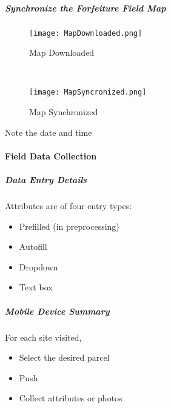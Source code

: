 

 \clearpage


 \subparagraph{Synchronize the Forfeiture Field Map}

 \begin{wrapfigure}{r}{0.5\textwidth}
 \centering
     \texttt{[image: MapDownloaded.png]}
 \caption{Map Downloaded}
 \vspace{.25in}

 \HRule \\[.4cm] %
 \vspace{.25in}

     \texttt{[image: MapSyncronized.png]}
 \caption{Map Synchronized}
 \end{wrapfigure}
 Note the date and time
 \vspace{1in}

 \vspace{3in}

 \vspace{1in}

 \clearpage

 \paragraph{Field Data Collection}
 \subparagraph{Data Entry Details}

 Attributes are of four entry types:
 \begin{itemize}
 \item Prefilled {\scriptsize (in preprocessing)}
 \item Autofill
 \item Dropdown
 \item Text box
 \end{itemize}
 \vspace{1in}

 \subparagraph{Mobile Device Summary}

 For each site visited,

 \begin{itemize}
 \item Select the desired parcel
 \item Push 
 \item Collect attributes or photos
 \end{itemize}

